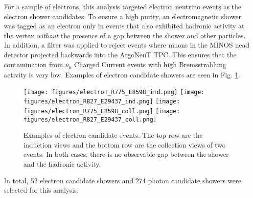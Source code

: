 For a sample of electrons, this analysis targeted electron neutrino events as 
the electron shower candidates.  To ensure a high purity, an electromagnetic shower 
 was tagged as an electron only in events that also exhibited hadronic activity at the 
vertex {\em without} the presence of a gap between the shower and other 
particles.  In addition, a filter was applied to reject events where muons 
in the MINOS nead detector projected backwards into the ArgoNeuT TPC.  This 
ensures that the contamination from $\nu_\mu$ Charged Current events with high 
Bremsstrahlung activity is very low.  Examples of electron candidate showers are 
seen in Fig. \ref{fig:electrons}.

\begin{figure}[h]
\centering
\texttt{[image: figures/electron\_R775\_E8598\_ind.png]}
\texttt{[image: figures/electron\_R827\_E29437\_ind.png]}
\texttt{[image: figures/electron\_R775\_E8598\_coll.png]}
\texttt{[image: figures/electron\_R827\_E29437\_coll.png]}
\caption{\label{fig:electrons} Examples of electron candidate events.  The top row 
are the induction views and the bottom row are the collection views of two events. 
In both cases, there is no observable gap between the 
shower and the hadronic activity.}
\end{figure}


In total, 52 electron candidate showers and 274 photon candidate showers were 
selected for this analysis.






